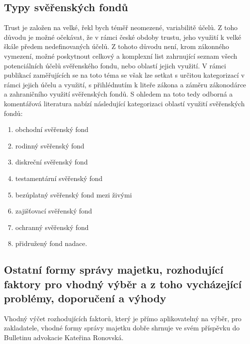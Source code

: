 \documentclass{article}
\begin{document}
\newpage
\thispagestyle{smallertextinheader}

\subsection{Typy svěřenských fondů}




Trust je založen na velké, řekl bych téměř neomezené, variabilitě účelů. Z toho důvodu je možné očekávat, že v rámci české obdoby trustu, jeho využití k velké škále předem nedefinovaných účelů. Z tohoto důvodu není, krom zákonného vymezení, možné poskytnout celkový a komplexní list zahrnující seznam všech potenciálních účelů svěřenského fondu, nebo oblastí jejich využití. V rámci publikací zaměřujících se na toto téma se však lze setkat s určitou kategorizací v rámci jejich účelu a využití, s přihlédnutím k liteře zákona a záměru zákonodárce a zahraničního využití svěřenských fondů. S ohledem na toto tedy odborná a komentářová literatura nabízí následující kategorizaci oblastí využití svěřenských fondů:

\begin{enumerate}
\item obchodní svěřenský fond
\item rodinný svěřenský fond
\item diskreční svěřenský fond
\item testamentární svěřenský fond
\item bezúplatný svěřenský fond mezi živými
\item zajišťovací svěřenský fond
\item ochranný svěřenský fond
\item přidružený fond nadace.
\end{enumerate}

\subsection{Ostatní formy správy majetku, rozhodující faktory pro vhodný výběr a z toho vycházející problémy, doporučení a výhody}

Vhodný výčet rozhodujících faktorů, který je přímo aplikovatelný na výběr, pro zakladatele, vhodné formy správy majetku dobře shrnuje ve svém příspěvku do Bulletinu advokacie Kateřina Ronovská.\\
\end{document}
